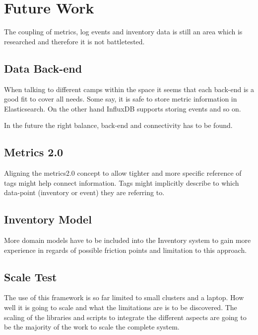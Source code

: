 \section{Future Work}

The coupling of metrics, log events and inventory data is still an area which is researched and therefore it is not battletested.

\subsection{Data Back-end}
When talking to different camps within the space it seems that each back-end is a good fit to cover all needs.
Some say, it is safe to store metric information in Elasticsearch. On the other hand InfluxDB supports storing events and so on.

In the future the right balance, back-end and connectivity has to be found.

\subsection{Metrics 2.0}
Aligning the metrics2.0 concept to allow tighter and more specific reference of tags might help connect information.
Tags might implicitly describe to which data-point (inventory or event) they are referring to.

\subsection{Inventory Model}
More domain models have to be included into the Inventory system to gain more experience in regards of possible friction points and limitation to this approach.

\subsection{Scale Test}
The use of this framework is so far limited to small clusters and a laptop. How well it is going to scale and what the limitations are is to be discovered.
The scaling of the libraries and scripts to integrate the different aspects are going to be the majority of the work to scale the complete system.

